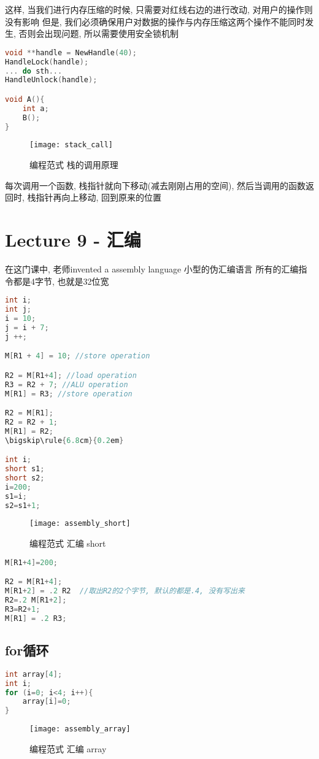 \documentclass{article}
\begin{document}
这样, 当我们进行内存压缩的时候, 只需要对红线右边的进行改动, 对用户的操作则没有影响
但是, 我们必须确保用户对数据的操作与内存压缩这两个操作不能同时发生, 否则会出现问题, 所以需要使用安全锁机制
\begin{lstlisting}[language = C]
void **handle = NewHandle(40);
HandleLock(handle);
... do sth...
HandleUnlock(handle);

void A(){
	int a;
	B();
}
\end{lstlisting}
\begin{figure}[htbp]
	\centering
	\texttt{[image: stack\_call]}\\
	\caption{编程范式 栈的调用原理}\label{fig.stack.call}
\end{figure}

每次调用一个函数, 栈指针就向下移动(减去刚刚占用的空间), 然后当调用的函数返回时, 栈指针再向上移动, 回到原来的位置

\section{Lecture 9 - 汇编}
在这门课中, 老师invented a assembly language
小型的伪汇编语言
所有的汇编指令都是4字节, 也就是32位宽

\begin{lstlisting}[language = C]
int i;
int j;
i = 10;
j = i + 7;
j ++;

M[R1 + 4] = 10; //store operation

R2 = M[R1+4]; //load operation
R3 = R2 + 7; //ALU operation
M[R1] = R3; //store operation

R2 = M[R1];
R2 = R2 + 1;
M[R1] = R2;
\bigskip\rule{6.8cm}{0.2em}

int i;
short s1;
short s2;
i=200;
s1=i;
s2=s1+1;
\end{lstlisting}
\begin{figure}[htbp]
	\centering
	\texttt{[image: assembly\_short]}\\
	\caption{编程范式 汇编 short}\label{fig.assembly.short}
\end{figure}


\begin{lstlisting}[language = C]
M[R1+4]=200;

R2 = M[R1+4];
M[R1+2] = .2 R2  //取出R2的2个字节, 默认的都是.4, 没有写出来
R2=.2 M[R1+2];
R3=R2+1;
M[R1] = .2 R3;
\end{lstlisting}

\subsection{for循环}
\begin{lstlisting}[language = C]
int array[4];
int i;
for (i=0; i<4; i++){
	array[i]=0;
}
\end{lstlisting}
\begin{figure}[htbp]
	\centering
	\texttt{[image: assembly\_array]}\\
	\caption{编程范式 汇编 array}\label{fig.assembly.array}
\end{figure}
\end{document}
